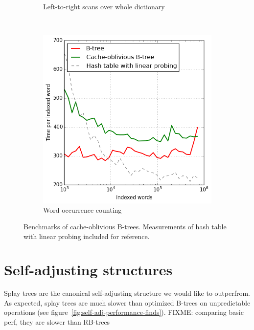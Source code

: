 \begin{figure}
\begin{subfigure}[t]{0.45\textwidth}
	\caption{Left-to-right scans over whole dictionary}
\end{subfigure}
~
\begin{subfigure}[t]{0.45\textwidth}
	\includegraphics[width=\textwidth]{img/performance/cob-performance-6}
	\caption{Word occurrence counting}
\end{subfigure}
\caption{Benchmarks of cache-oblivious B-trees.
	Measurements of hash table with linear probing included for reference.}
\label{fig:cob-performance}
\end{figure}

\section{Self-adjusting structures}
Splay trees are the canonical self-adjusting structure we would like to
outperfrom. As expected, splay trees are much slower than optimized B-trees on
unpredictable operations (see figure~\ref{fig:self-adj-performance-finds}).
FIXME: comparing basic perf, they are slower than RB-trees

